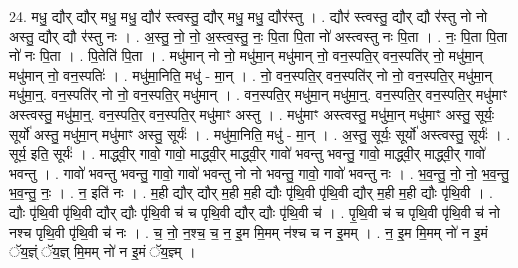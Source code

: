 \documentclass[17pt]{extarticle}
\begin{document}
24. मधु॒ द्यौर् द्यौर् मधु॒ मधु॒ द्यौर॑ स्त्वस्तु॒ द्यौर् मधु॒ मधु॒ द्यौर॑स्तु । . द्यौर॑ स्त्वस्तु॒ द्यौर् द्यौ र॑स्तु नो नो अस्तु॒ द्यौर् द्यौ र॑स्तु नः । . अ॒स्तु॒ नो॒ नो॒ अ॒स्त्व॒स्तु॒ नः॒ पि॒ता पि॒ता नो॑ अस्त्वस्तु नः पि॒ता । . नः॒ पि॒ता पि॒ता नो॑ नः पि॒ता । . पि॒तेति॑ पि॒ता । . मधु॑मान् नो नो॒ मधु॑मा॒न् मधु॑मान् नो॒ वन॒स्पति॒र् वन॒स्पति॑र् नो॒ मधु॑मा॒न् मधु॑मान् नो॒ वन॒स्पतिः॑ । . मधु॑मा॒निति॒ मधु॑ - मा॒न् । . नो॒ वन॒स्पति॒र् वन॒स्पति॑र् नो नो॒ वन॒स्पति॒र् मधु॑मा॒न् मधु॑मा॒न्॒. वन॒स्पति॑र् नो नो॒ वन॒स्पति॒र् मधु॑मान् । . वन॒स्पति॒र् मधु॑मा॒न् मधु॑मा॒न्॒. वन॒स्पति॒र् वन॒स्पति॒र् मधु॑माꣳ अस्त्वस्तु॒ मधु॑मा॒न्॒. वन॒स्पति॒र् वन॒स्पति॒र् मधु॑माꣳ अस्तु । . मधु॑माꣳ अस्त्वस्तु॒ मधु॑मा॒न् मधु॑माꣳ अस्तु॒ सूर्यः॒ सूर्यो॑ अस्तु॒ मधु॑मा॒न् मधु॑माꣳ अस्तु॒ सूर्यः॑ । . मधु॑मा॒निति॒ मधु॑ - मा॒न् । . अ॒स्तु॒ सूर्यः॒ सूर्यो॑ अस्त्वस्तु॒ सूर्यः॑ । . सूर्य॒ इति॒ सूर्यः॑ । . माद्ध्वी॒र् गावो॒ गावो॒ माद्ध्वी॒र् माद्ध्वी॒र् गावो॑ भवन्तु भवन्तु॒ गावो॒ माद्ध्वी॒र् माद्ध्वी॒र् गावो॑ भवन्तु । . गावो॑ भवन्तु भवन्तु॒ गावो॒ गावो॑ भवन्तु नो नो भवन्तु॒ गावो॒ गावो॑ भवन्तु नः । . भ॒व॒न्तु॒ नो॒ नो॒ भ॒व॒न्तु॒ भ॒व॒न्तु॒ नः॒ । . न॒ इति॑ नः । . म॒ही द्यौर् द्यौर् म॒ही म॒ही द्यौः पृ॑थि॒वी पृ॑थि॒वी द्यौर् म॒ही म॒ही द्यौः पृ॑थि॒वी । . द्यौः पृ॑थि॒वी पृ॑थि॒वी द्यौर् द्यौः पृ॑थि॒वी च॑ च पृथि॒वी द्यौर् द्यौः पृ॑थि॒वी च॑ । . पृ॒थि॒वी च॑ च पृथि॒वी पृ॑थि॒वी च॑ नो नश्च पृथि॒वी पृ॑थि॒वी च॑ नः । . च॒ नो॒ न॒श्च॒ च॒ न॒ इ॒म मि॒मम् न॑श्च च न इ॒मम् । . न॒ इ॒म मि॒मम् नो॑ न इ॒मं ॅय॒ज्ञ्ं ॅय॒ज्ञ् मि॒मम् नो॑ न इ॒मं ॅय॒ज्ञ्म् । \newline
\end{document}
